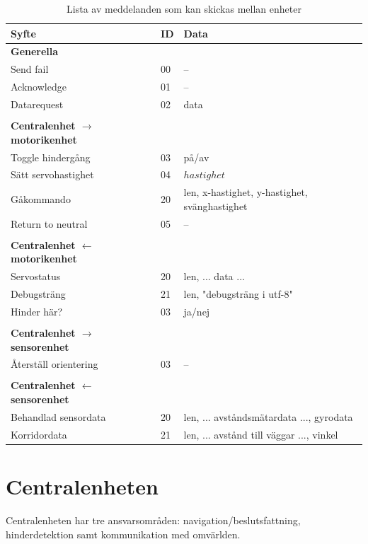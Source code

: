 \documentclass[a4paper,titlepage,12pt]{article}
\begin{document}
	\begin{table}
		\begin{longtable}[c]{ l l l }
			\textbf{Syfte} & \textbf{ID} & \textbf{Data} \\ \midrule
			\textbf{Generella} \\ \midrule
			Send fail & 00 & -- \\ \midrule
			Acknowledge & 01 & -- \\ \midrule
			Datarequest & 02 & data \\ \midrule
			\\
			\textbf{Centralenhet $ \to $ motorikenhet}\\ \midrule
			Toggle hindergång & 03 & på/av \\ \midrule
			Sätt servohastighet & 04 & $ hastighet $ \\ \midrule
			Gåkommando &  20 & len, x-hastighet, y-hastighet, svänghastighet \\ \midrule
			Return to neutral & 05 & -- \\ \midrule
			\\
			\textbf{Centralenhet $ \gets $ motorikenhet}\\ \midrule
			Servostatus & 20 & len, ... data ... \\ \midrule
			Debugsträng & 21 & len, "debugsträng i utf-8" \\ \midrule
			Hinder här? & 03 & ja/nej \\ \midrule
			\\
			\textbf{Centralenhet $\to$ sensorenhet} \\ \midrule
			Återställ orientering & 03 & -- \\ \midrule
			\\
			\textbf{Centralenhet $ \gets $ sensorenhet}\\ \midrule
			Behandlad sensordata & 20 & len, ... avståndsmätardata ..., gyrodata \\ \midrule
			Korridordata		 & 21 & len, ... avstånd till väggar ..., vinkel \\
		\end{longtable}

		\vspace{0.5cm}
		\label{table:messages}
		\caption{Lista av meddelanden som kan skickas mellan enheter}
	\end{table}
	
	
	\section{Centralenheten}
	Centralenheten har tre ansvarsområden: navigation/beslutsfattning, hinderdetektion samt
	kommunikation med omvärlden.
\end{document}
